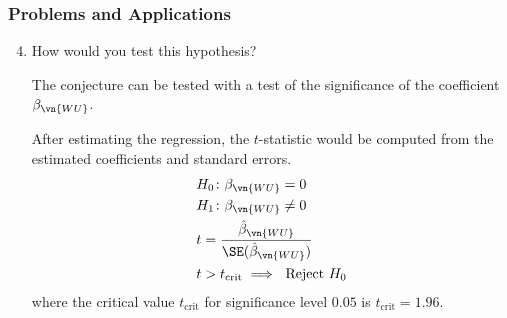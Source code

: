 \begin{frame}
\frametitle{Problems and Applications}

\begin{enumerate}\setcounter{enumi}{3}

\item How would you test this hypothesis?

\begin{answer}
The conjecture can be tested with a test of the significance of the coefficient $\beta_{\vn{WU}}$. 

After estimating the regression, the $t$-statistic would be computed from the estimated coefficients and standard errors. 
\begin{align*}
& H_{0}\colon \beta_{\vn{WU}} = 0\\
& H_{1}\colon \beta_{\vn{WU}} \neq 0\\
& t = \frac{\hat{\beta}_{\vn{WU}}}{\SE(\hat{\beta}_{\vn{WU}})}\\
& t > t_{\text{crit}} \implies ~\text{Reject}~ H_{0}
\end{align*}
where the critical value $t_{\text{crit}}$ for significance level $0.05$ is $t_{\text{crit}}=1.96$.
\end{answer}

\end{enumerate}

\end{frame}



